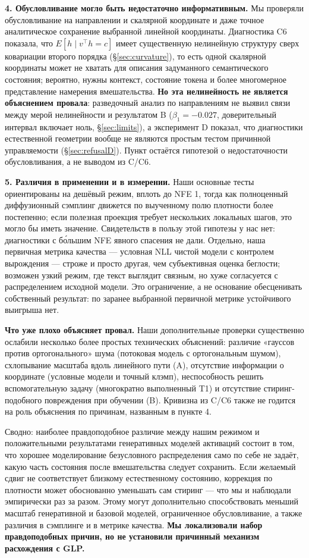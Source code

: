\documentclass[10pt,a4paper]{article}
\begin{document}
\textbf{4. Обусловливание могло быть недостаточно информативным.} Мы проверяли
обусловливание на направлении и скалярной координате и даже точное аналитическое
сохранение выбранной линейной координаты. Диагностика C6 показала, что
$E[h \mid v^\top h = c]$ имеет существенную нелинейную структуру сверх ковариации
второго порядка (\S\ref{sec:curvature}), то есть одной скалярной координаты может
не хватать для описания задуманного семантического состояния; вероятно, нужны
контекст, состояние токена и более многомерное представление намерения
вмешательства. \textbf{Но эта нелинейность не является объяснением провала}:
разведочный анализ по направлениям не выявил связи между мерой нелинейности и
результатом B ($\beta_1 = -0.027$, доверительный интервал включает ноль,
\S\ref{sec:limits}), а эксперимент D показал, что
диагностики естественной геометрии вообще не являются простым тестом причинной
управляемости (\S\ref{sec:refusalD}). Пункт остаётся гипотезой о недостаточности
обусловливания, а не выводом из C/C6.

\textbf{5. Различия в применении и в измерении.} Наши основные тесты
ориентированы на дешёвый режим, вплоть до NFE 1, тогда как полноценный
диффузионный сэмплинг движется по выученному полю плотности более постепенно;
если полезная проекция требует нескольких локальных шагов, это могло бы иметь
значение. Свидетельств в пользу этой гипотезы у нас нет: диагностики с бо́льшим
NFE явного спасения не дали. Отдельно, наша первичная метрика качества — условная
NLL чистой модели с контролем вырождения — строже и просто другая, чем
субъективная оценка беглости; возможен узкий режим, где текст выглядит связным,
но хуже согласуется с распределением исходной модели. Это ограничение, а не
основание обесценивать собственный результат: по заранее выбранной первичной
метрике устойчивого выигрыша нет.

\textbf{Что уже плохо объясняет провал.} Наши дополнительные проверки
существенно ослабили несколько более простых технических объяснений: различие
«гауссов против ортогонального» шума (потоковая модель с ортогональным шумом),
схлопывание масштаба вдоль линейного пути (A), отсутствие информации о координате
(условные модели и точный клэмп), неспособность решить вспомогательную задачу
(многократно выполненный T1) и отсутствие стиринг-подобного повреждения при обучении
(B). Кривизна из C/C6 также не годится на роль объяснения по причинам, названным
в пункте 4.

\medskip
Сводно: наиболее правдоподобное различие между нашим режимом и положительными
результатами генеративных моделей активаций состоит в том, что хорошее
моделирование безусловного распределения само по себе не задаёт, какую часть
состояния после вмешательства следует сохранить. Если желаемый сдвиг не соответствует
близкому естественному состоянию, коррекция по плотности может обоснованно
уменьшать сам стиринг — что мы и наблюдали эмпирически раз за разом. Этому могут
дополнительно способствовать меньший масштаб генеративной и базовой моделей,
ограниченное обусловливание, а также различия в сэмплинге и в метрике качества.
\textbf{Мы локализовали набор правдоподобных причин, но не установили причинный
механизм расхождения с GLP.}
\end{document}
